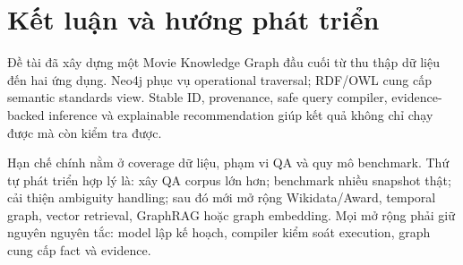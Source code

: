 \chapter{Kết luận và hướng phát triển}

Đề tài đã xây dựng một Movie Knowledge Graph đầu cuối từ thu thập dữ liệu đến hai
ứng dụng. Neo4j phục vụ operational traversal; RDF/OWL cung cấp semantic standards
view. Stable ID, provenance, safe query compiler, evidence-backed inference và
explainable recommendation giúp kết quả không chỉ chạy được mà còn kiểm tra được.

Hạn chế chính nằm ở coverage dữ liệu, phạm vi QA và quy mô benchmark. Thứ tự phát
triển hợp lý là: xây QA corpus lớn hơn; benchmark nhiều snapshot thật; cải thiện
ambiguity handling; sau đó mới mở rộng Wikidata/Award, temporal graph, vector
retrieval, GraphRAG hoặc graph embedding. Mọi mở rộng phải giữ nguyên nguyên tắc: model lập kế hoạch,
compiler kiểm soát execution, graph cung cấp fact và evidence.

